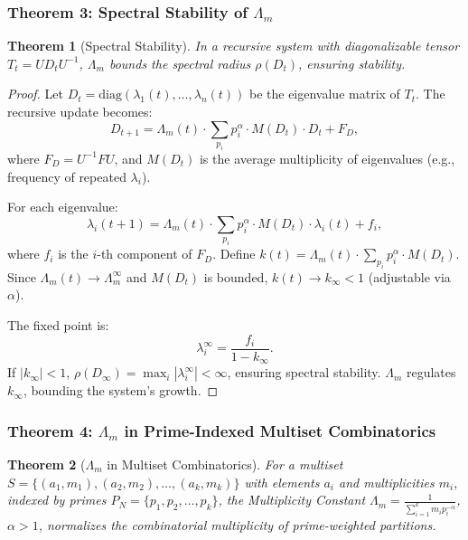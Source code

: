 \documentclass[12pt]{article}
\newtheorem{theorem}{Theorem}[section]
\begin{document}
\subsubsection{Theorem 3: Spectral Stability of \(\Lambda_m\)}
\begin{theorem}[Spectral Stability]
In a recursive system with diagonalizable tensor \( T_t = U D_t U^{-1} \), \(\Lambda_m\) bounds the spectral radius \(\rho(D_t)\), ensuring stability.
\end{theorem}

\begin{proof}
Let \( D_t = \text{diag}(\lambda_1(t), \ldots, \lambda_n(t)) \) be the eigenvalue matrix of \( T_t \). The recursive update becomes:
\[
D_{t+1} = \Lambda_m(t) \cdot \sum_{p_i} p_i^\alpha \cdot M(D_t) \cdot D_t + F_D,
\]
where \( F_D = U^{-1} F U \), and \( M(D_t) \) is the average multiplicity of eigenvalues (e.g., frequency of repeated \(\lambda_i\)).

For each eigenvalue:
\[
\lambda_i(t+1) = \Lambda_m(t) \cdot \sum_{p_i} p_i^\alpha \cdot M(D_t) \cdot \lambda_i(t) + f_i,
\]
where \( f_i \) is the \( i \)-th component of \( F_D \). Define \( k(t) = \Lambda_m(t) \cdot \sum_{p_i} p_i^\alpha \cdot M(D_t) \). Since \( \Lambda_m(t) \to \Lambda_m^\infty \) and \( M(D_t) \) is bounded, \( k(t) \to k_\infty < 1 \) (adjustable via \(\alpha\)).

The fixed point is:
\[
\lambda_i^\infty = \frac{f_i}{1 - k_\infty}.
\]
If \( |k_\infty| < 1 \), \(\rho(D_\infty) = \max_i |\lambda_i^\infty| < \infty\), ensuring spectral stability. \(\Lambda_m\) regulates \( k_\infty \), bounding the system’s growth.
\end{proof}

\subsubsection{Theorem 4: \(\Lambda_m\) in Prime-Indexed Multiset Combinatorics}
\begin{theorem}[\(\Lambda_m\) in Multiset Combinatorics]
For a multiset \( S = \{ (a_1, m_1), (a_2, m_2), \ldots, (a_k, m_k) \} \) with elements \( a_i \) and multiplicities \( m_i \), indexed by primes \( P_N = \{ p_1, p_2, \ldots, p_k \} \), the Multiplicity Constant \(\Lambda_m = \frac{1}{\sum_{i=1}^k m_i p_i^{-\alpha}}\), \(\alpha > 1\), normalizes the combinatorial multiplicity of prime-weighted partitions.
\end{theorem}
\end{document}
